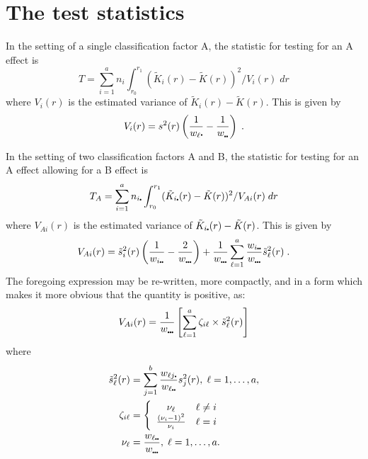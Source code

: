 \documentclass[12pt]{article}
\newcommand{\pt}{\mbox{\scalebox{0.4}{$\bullet$}}}
\newcommand{\tils}{\mbox{$\tilde{s}$}}
\begin{document}
\section{The test statistics}
In the setting of a single classification factor A, the statistic
for testing for an A effect is
\[
T = \sum_{i=1}^a n_i \int_{r_0}^{r_1} (\tilde{K}_i(r) - 
                 \tilde{K}(r))^2/V_i(r) \; dr
\]
where $V_i(r)$ is the estimated variance of $\tilde{K}_i(r) - \tilde{K}(r)$.
This is given by
\[
V_i(r) = s^2(r) \left ( \frac{1}{w_\ell \pt} - \frac{1}{w_{\pt \pt}} \right ) \; .
\]

In the setting of two classification factors A and B, the statistic
for testing for an A effect allowing for a B effect is
\[
T_A = \sum_{i=1}^a n_{i \pt} \int_{r_0}^{r_1} (\tilde{K}_{i \pt}(r) -
                 \tilde{K}(r))^2/V_{Ai}(r) \; dr
\]
where $V_{Ai}(r)$ is the estimated variance of $\tilde{K}_{i \pt}(r) - \tilde{K}(r)$.
This is given by
\[
V_{Ai}(r) = \tils_i^2(r) \left ( \frac{1}{w_{i \pt \pt}} - \frac{2}{w_{\pt \pt \pt}}
                      \right ) + \frac{1}{w_{\pt \pt \pt}} \sum_{\ell=1}^a
                      \frac{w_{i \pt \pt}}{w_{\pt \pt \pt}} \tils_{\ell}^2(r) \; .
\]
The foregoing expression may be re-written, more compactly, and in a form which
makes it more obvious that the quantity is positive, as:
\[
V_{Ai}(r) = \frac{1}{w_{\pt \pt \pt}} \left [
            \sum_{\ell=1}^a \zeta_{i \ell} \times \tils^2_{\ell}(r) \right ]
\]
where
\begin{align*}
\tils^2_{\ell}(r) &= \sum_{j=1}^b \frac{w_{\ell j\pt}}{w_{\ell \pt \pt}} s_j^2(r),
\; \ell = 1, \ldots, a, \\
\zeta_{i \ell} &= \left \{ \begin{array}{cl}
               \nu_{\ell} & \ell \neq i \\
               \frac{(\nu_i - 1)^2}{\nu_i} & \ell = i 
               \end{array} \right . \\
\nu_{\ell} &= \frac{w_{\ell \pt \pt}}{w_{\pt \pt \pt}}, \;
\ell = 1, \ldots, a.
\end{align*}
\end{document}
